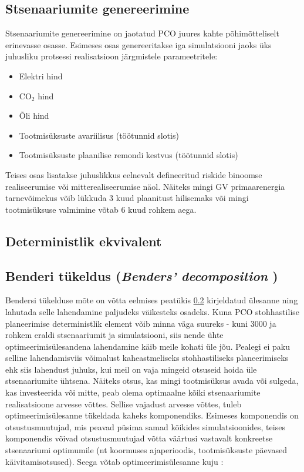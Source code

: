 \documentclass[10pt,a4paper]{article}
\begin{document}
\subsection{Stsenaariumite genereerimine}
\label{sec:stoch_gen}
Stsenaariumite genereerimine on jaotatud PCO juures kahte põhimõtteliselt erinevasse osasse. Esimeses osas genereeritakse iga simulatsiooni jaoks üks juhusliku protsessi realisatsioon järgmistele parameetritele:
\begin{itemize}
\item Elektri hind
\item CO$_2$ hind
\item Õli hind
\item Tootmisüksuste avariilisus (töötunnid slotis)
\item Tootmisüksuste plaanilise remondi kestvus (töötunnid slotis)
\end{itemize}
Teises osas lisatakse juhuslikkus eelnevalt defineeritud riskide binoomse realiseerumise või mitterealiseerumise näol. Näiteks mingi GV primaarenergia tarnevõimekus võib lükkuda 3 kuud plaanitust hilisemaks või mingi tootmisüksuse valmimine võtab 6 kuud rohkem aega.

\subsection{Deterministlik ekvivalent}
\label{sec:stoch_det}
\subsection{Benderi tükeldus (\emph{Benders' decomposition} ) }
\label{sec:stoch_bender}
Bendersi tükelduse mõte on võtta eelmises peatükis \ref{sec:stoch_det} kirjeldatud ülesanne ning lahutada selle lahendamine paljudeks väikesteks osadeks. Kuna PCO stohhastilise planeerimise deterministlik element võib minna väga suureks - kuni 3000 ja rohkem eraldi stsenaariumit ja simulatsiooni, siis nende ühte optimeerimisülesandena lahendamine käib meile kohati üle jõu. Pealegi ei paku selline lahendamisviis võimalust kaheastmeliseks stohhastiliseks planeerimiseks ehk siis lahendust juhuks, kui meil on vaja mingeid otsuseid hoida üle stsenaariumite ühtsena. Näiteks otsus, kas mingi tootmisüksus avada või sulgeda, kas investeerida või mitte, peab olema optimaalne kõiki stsenaariumite realisatsioone arvesse võttes. Sellise vajadust arvesse võttes, tuleb optimeerimisülesanne tükeldada kaheks komponendiks. Esimeses komponendis on otsustusmuutujad, mis peavad püsima samad kõikides simulatsioonides, teises komponendis võivad otsustusmuutujad võtta väärtusi vastavalt konkreetse stsenaariumi optimumile (nt koormuses ajaperioodis, tootmisüksuste päevased käivitamisotsused). Seega võtab optimeerimisülesanne kuju \cite{Benders1962, Kalvelagen2012}:
\end{document}
